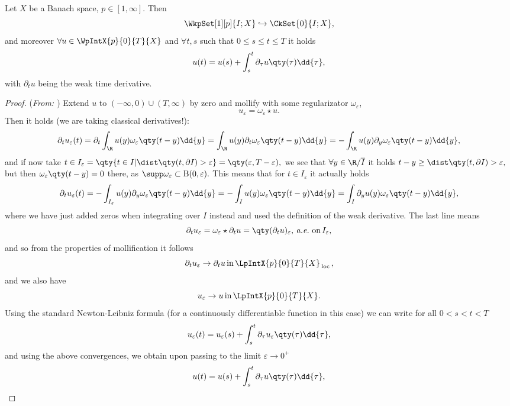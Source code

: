 \begin{theorem}
	Let $X$ be a Banach space, $ p \in [1, \infty].$ Then
	\[
		\WkpSet[1][p]{I; X} \hookrightarrow \CkSet{0}{I; X},
	\]
	and moreover $\forall u \in \WpIntX{p}{0}{T}{X}$ and $\forall t,s$ such that  $0 \leq s \leq t \leq T$ it holds
	\[
		u(t) = u(s) + \int_s^t \partial_{\tau} u\qty(\tau)\dd{\tau},
	\]
	with $\partial_t u$ being the weak time derivative.
\end{theorem}
\begin{proof}(\textit{From: \cite{evansPartialDifferentialEquations2010}})
Extend $u$ to $(-\infty, 0) \cup (T, \infty)$ by zero and mollify with some regularizator $\omega_{\varepsilon}$,
\[
	u_{\varepsilon} = \omega_{\varepsilon} \star u.
\]
Then it holds (we are taking classical derivatives!):
\[
	\partial_t u_{\varepsilon}(t) = \partial_t \int_{\R}u(y) \omega_{\varepsilon}\qty(t-y) \dd{y} = \int_{\R} u(y) \partial_t \omega_{\varepsilon}\qty(t-y) \dd{y} = - \int_{\R}u(y) \partial_{y}\omega_{\varepsilon}\qty(t-y)\dd{y},
\]
and if now take $t \in I_{\varepsilon} = \qty{t \in I| \dist\qty(t, \partial I) > \varepsilon} = \qty(\varepsilon, T- \varepsilon),$ we see that $\forall y \in \R / \overline{I}$ it holds $t - y \geq \dist\qty(t,\partial I) > \varepsilon,$ but then $\omega_{\varepsilon}\qty(t-y) = 0$ there, as $\supp \omega_{\varepsilon} \subset \text{B}(0,\varepsilon).$ This means that for $t \in I_{\varepsilon}$ it actually holds
\[
	\partial_t u_{\varepsilon}(t) = - \int_{I_{\varepsilon}}u(y) \partial_{y} \omega_{\varepsilon}\qty(t-y)\dd{y} = - \int_{I}u(y) \omega_{\varepsilon}\qty(t-y)\dd{y} = \int_{I}\partial_{y} u(y) \omega_{\varepsilon}\qty(t-y)\dd{y},
\]
where we have just added zeros when integrating over $I$ instead and used the definition of the weak derivative. The last line means
\[
	\partial_t u_{\varepsilon} = \omega_{\varepsilon} \star \partial_t u = \qty(\partial_t u)_{\varepsilon}, \, \text{\textit{a.e.}} \, \, \text{on} \, I_{\varepsilon},
\]
and so from the properties of mollification it follows
\[
	\partial_t u_{\varepsilon} \to \partial_t u \, \text{in} \,\LpIntX{p}{0}{T}{X}_{\, \text{loc} \,},
\]
and we also have
\[
	u_{\varepsilon} \to u \, \text{in} \, \LpIntX{p}{0}{T}{X}.
\]
Using the standard Newton-Leibniz formula (for a continuously differentiable function in this case) we can write for all $0 < s < t <T$
\[
	u_{\varepsilon}(t) = u_{\varepsilon}(s) + \int_s^t \partial_{\tau}u_{\varepsilon}\qty(\tau) \dd{\tau},
\]
and using the above convergences, we obtain upon passing to the limit $\varepsilon \to 0^+$
\[
	u(t) = u(s) + \int_s^t \partial_{\tau}u\qty(\tau)\dd{\tau},
\]
\end{proof}
